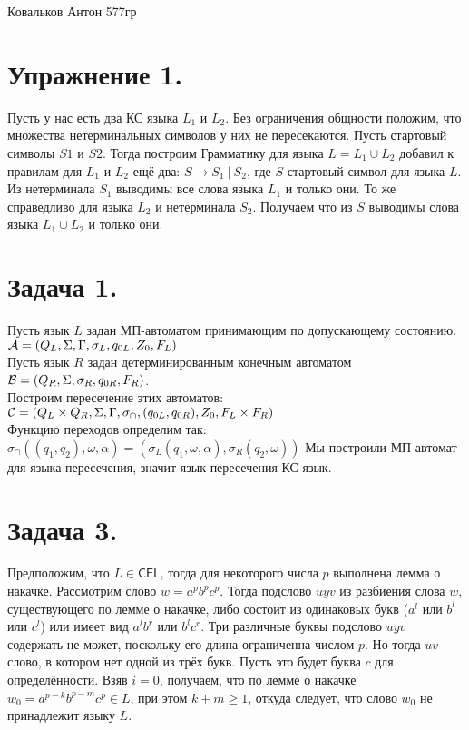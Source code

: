 \documentclass[12pt]{article}
\theoremstyle{definition}
\theoremstyle{definition}
\let\geq\geqslant
\let\ra\rightarrow
\let\o\omega
\def\A{{\cal A}}
\def\B{{\cal B}}
\def\C{{\cal C}}
\def\CFL{{\mathsf{CFL}}}
\begin{document}
\begin{center} {\LARGE Ковальков Антон 577гр} \end{center}
\section*{Упражнение  1.}
Пусть у нас есть два КС языка $L_1$ и $L_2$. Без ограничения общности положим, что множества нетерминальных символов у них не пересекаются. Пусть стартовый символы $S1$ и $S2$. Тогда построим Грамматику для языка $L = L_1 \cup L_2$ добавил к правилам для $L_1$ и $L_2$ ещё два: $S \ra S_1\ |\ S_2$, где $S$ стартовый символ для языка $L$. Из нетерминала $S_1$ выводимы все слова языка $L_1$ и только они. То же справедливо для языка $L_2$ и нетерминала $S_2$. Получаем что из $S$ выводимы слова языка $L_1 \cup L_2$ и только они.

\section*{Задача 1.}
Пусть язык $L$ задан МП-автоматом принимающим по допускающему состоянию.\\
$\A = (Q_L, \Sigma, \Gamma, \sigma_L, q_{0L}, Z_0, F_L)$\\
Пусть язык $R$ задан детерминированным конечным автоматом\\ $\B = (Q_R, \Sigma, \sigma_R, q_{0R}, F_R)$.\\
Построим пересечение этих автоматов:\\
$ \C = (Q_L \times Q_R, \Sigma, \Gamma, \sigma_\cap, (q_{0L}, q_{0R}), Z_0, F_L \times F_R)$\\
Функцию переходов определим так: \\
$\sigma_\cap((q_1, q_2), \o, \alpha) = (\sigma_L(q_1, \o, \alpha), \sigma_R(q_2, \o)) $
Мы построили МП автомат для языка пересечения, значит язык пересечения КС язык.

\section*{Задача 3.}
Предположим, что $L\in \CFL$, тогда для некоторого числа $p$ выполнена лемма о накачке. Рассмотрим слово $w = a^pb^pc^p$. Тогда подслово $uyv$ из разбиения слова $w$, существующего по лемме о накачке, либо состоит из одинаковых букв ($a^l$ или $b^l$ или $c^l$) или имеет вид $a^lb^r$ или $b^lc^r$. Три различные буквы подслово $uyv$ содержать не может, поскольку его длина ограниченна числом $p$. Но тогда $uv$ -- слово, в котором нет одной из трёх букв. Пусть это будет буква $c$ для определённости. Взяв $i = 0$, получаем, что по лемме о накачке $w_0 = a^{p-k}b^{p-m}c^p \in L $, при этом $k+m \geq 1$, откуда следует, что слово $w_0$ не принадлежит языку $L$. 
\end{document}
